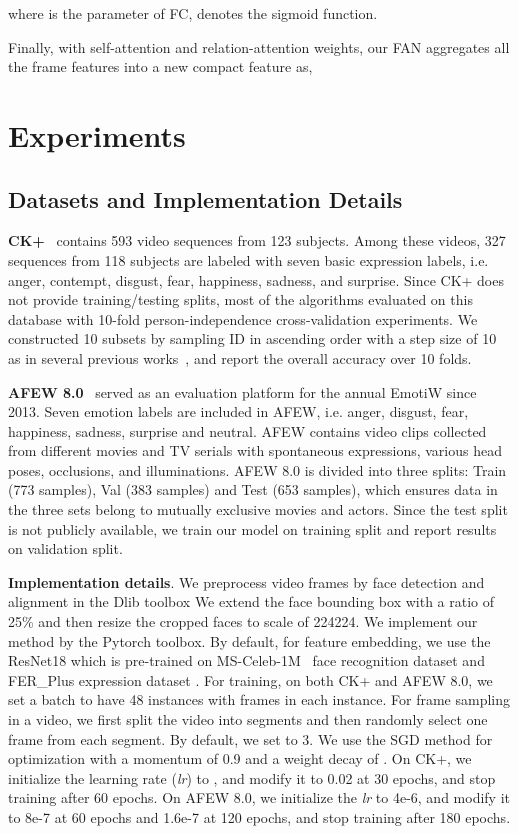 \documentclass{article}
\begin{document}
where  is the parameter of FC,  denotes the sigmoid function. 

Finally, with self-attention and relation-attention weights, our FAN aggregates all the frame features into a new compact feature as,


\section{Experiments}
\label{sec:experiments}
\subsection{Datasets and Implementation Details}
\textbf{CK+}~\cite{lucey2010extended} contains 593 video sequences from 123 subjects. Among these videos, 327 sequences from 118 subjects are labeled with seven basic expression labels, i.e. anger, contempt, disgust, fear, happiness, sadness, and surprise. Since CK+ does not provide training/testing splits, most of the algorithms evaluated on this database with 10-fold person-independence cross-validation experiments. We constructed 10 subsets by sampling ID in ascending order with a step size of 10 as in several previous works~\cite{liu2014learning,kuo2018compact}, and report the overall accuracy over 10 folds.


\textbf{AFEW 8.0}~\cite{dhall2018emotiw} served as an evaluation platform for the annual EmotiW since 2013. Seven emotion labels are included in AFEW, i.e. anger, disgust, fear, happiness, sadness, surprise and neutral. AFEW contains video clips collected from different movies and TV serials with spontaneous expressions, various head poses, occlusions, and illuminations. AFEW 8.0 is divided into three splits: Train (773 samples), Val (383 samples) and Test (653 samples), which ensures data in the three sets belong to mutually exclusive movies and actors. Since the test split is not publicly available, we train our model on training split and report results on validation split.

\textbf{Implementation details}.
We preprocess video frames by face detection and alignment in the Dlib toolbox
We extend the face bounding box with a ratio of 25\% and then resize the cropped faces to scale of 224224.
We implement our method by the Pytorch toolbox.
By default, for feature embedding, we use the ResNet18 which is pre-trained on MS-Celeb-1M~\cite{guo2016ms} face recognition dataset and FER\_Plus expression dataset \cite{BarsoumICMI2016}.
For training, on both CK+ and AFEW 8.0, we set a batch to have 48 instances with  frames in each instance. For frame sampling in a video, we first split the video into  segments and then randomly select one frame from each segment. By default, we set  to 3. We use the SGD method for optimization with a momentum of 0.9 and a weight decay of .
On CK+, we initialize the learning rate (\textit{lr}) to , and modify it to 0.02 at 30 epochs, and stop training after 60 epochs. 
On AFEW 8.0, we initialize the \textit{lr} to 4e-6, and modify it to 8e-7 at 60 epochs and 1.6e-7 at 120 epochs, and stop training after 180 epochs. 
\end{document}
